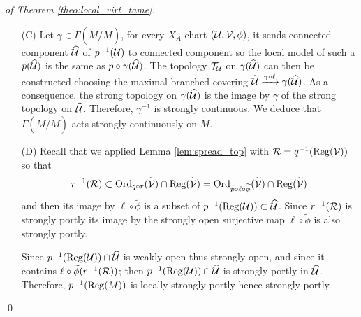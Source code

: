 \begin{proof}[of Theorem \ref{theo:local_virt_tame}]
\begin{itemize}
\begin{itemize}
\item  

Denote 
$\D_\U := \D_\alpha\circ r\circ \widetilde \phi$ which is strongly continuous and note that $\D_{\U|\reg(\widetilde \U)}$ is a $(G,X)$-morphism.
The holonomy of $\widetilde \U\rightarrow \widehat \U$  is trivial  
hence for all $\gamma\in \Gamma(\widetilde \U/\widehat \U)$, $(\D_\U \circ  \gamma)_{|\reg(\widetilde \U)} = \D_{\U|\reg(\widetilde \U)}$.

By the previous point and strong density of $\reg(\widetilde \U)$   we deduce that $$\forall \gamma \in \Gamma(\widetilde \U/ \widehat \U),\quad  \D_\V \circ  \gamma = \D_{\V}.$$



\item Since $\widetilde \U\rightarrow \widehat\U$ is Galoisian, $\Gamma(\widetilde \U/\widehat \U)$ acts transitively on the fibers of $\ell$.
We can thus descend $\D_{\U}$ to an a.e $(G,X)$-morphism  $\widehat \U\xrightarrow{\D_{\U,\V,\phi}} X$ with $\widehat \U$ endowed with the strong topology.

Since $\D_{|\reg(\widehat \U )}=g\D_{\U|\reg(\widehat \U)}$ for some $g\in G$, the developing map $\D_{|\reg(\widehat \U)}$ extends to a strongly continuous map on  $\widehat \U$. Finally, $\D_{|\reg(\widetilde M)}$ extends to an a.e. $(G,X)$-morphism for the strong topology on $\widetilde M$.
\end{itemize}
\item[(C)] Let $\gamma\in \Gamma(\widetilde M/M)$, for every $X_A$-chart $(\mathcal{U},\mathcal V,\phi)$, it sends connected component $\widehat \U$ of $p^{-1}(\mathcal{U})$ to connected component so the local model of such a $p(\widehat {\mathcal{U}})$ is the same as $p\circ \gamma (\widehat {\mathcal{U}})$.  The topology $\mathcal{T}_{\mathcal{U}}$ on $\gamma (\widehat {\mathcal{U}})$ can then be constructed choosing the maximal branched covering $\widetilde {\mathcal{U}}\xrightarrow{\gamma\circ \ell} \gamma(\widehat {\mathcal{U}})$. As a consequence, the strong topology on $\gamma(\widehat {\mathcal{U}})$ is the image by $\gamma$ of the strong topology on $ \widehat \U$. Therefore, $\gamma^{-1}$ is strongly continuous. We deduce that $\Gamma(\widetilde M/M)$  acts strongly continuously on $\widetilde M$.
   \item[(D)] Recall that we applied Lemma \ref{lem:spread_top} with $\mathcal R=q^{-1}(\mathrm{Reg}(\mathcal V))$ so that
  $$r^{-1}(\mathcal R)\subset \mathrm{Ord}_{q\circ r}(\widetilde {\mathcal V})\cap  \mathrm{Reg}(\widetilde {\mathcal V}) = \mathrm{Ord}_{p\circ \ell\circ \widetilde \phi}(\widetilde {\mathcal V})\cap  \mathrm{Reg}(\widetilde {\mathcal V})$$ and then its image by $\ell\circ \widetilde \phi$ is a subset of $p^{-1}(\mathrm{Reg}(\mathcal{U}))\subset \widehat {\mathcal{U}}$. Since $r^{-1}(\mathcal R)$ is strongly portly  its image by the strongly open surjective map $\ell \circ \widetilde \phi$ is also strongly portly.  
  
  Since $p^{-1}(\mathrm{Reg}(\mathcal{U}))\cap \widehat {\mathcal{U}}$ is weakly open thus strongly open, and since it contains $\ell\circ \widetilde \phi(r^{-1}(\mathcal R))$; then $p^{-1}(\mathrm{Reg}(\mathcal{U}))\cap \widehat {\mathcal{U}}$ is strongly portly in $\widehat \U$. Therefore, $p^{-1}(\mathrm{Reg}( M))$ is locally strongly portly hence strongly portly.

  \end{itemize}
\qed\end{proof}

